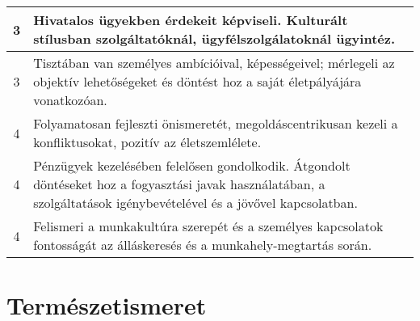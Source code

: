 \begin{longtable}{c | p{} }
                                
                                          3 &  Hivatalos ügyekben érdekeit képviseli. Kulturált stílusban szolgáltatóknál, ügyfélszolgálatoknál ügyintéz. \\ \hline
                                          3 &  Tisztában van személyes ambícióival, képességeivel; mérlegeli az objektív lehetőségeket és döntést hoz a saját életpályájára vonatkozóan. \\ \hline
                                      
                                
                                          4 &  Folyamatosan fejleszti önismeretét, megoldáscentrikusan kezeli a konfliktusokat,  pozitív az életszemlélete. \\ \hline
                                          4 &  Pénzügyek kezelésében felelősen gondolkodik. Átgondolt döntéseket hoz a fogyasztási javak használatában, a szolgáltatások igénybevételével és a jövővel kapcsolatban. \\ \hline
                                          4 &  Felismeri a munkakultúra szerepét és a személyes kapcsolatok fontosságát az álláskeresés és a munkahely-megtartás során. \\ \hline
                                      
                        \end{longtable}
            \clearpage

        \section{Természetismeret}

